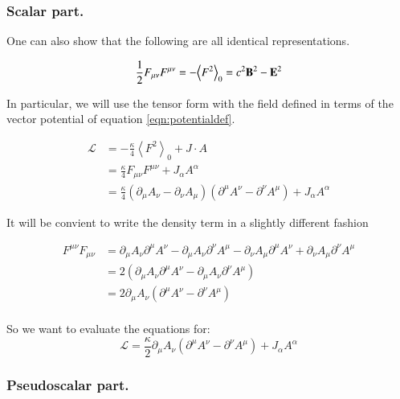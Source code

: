 \documentclass{article}
\newcommand{\LL}[0]{\mathcal{L}}
\newcommand{\gpgrade}[2] {{\left\langle{{#1}}\right\rangle}_{#2}}
\newcommand{\gpgradezero}[1] {\gpgrade{#1}{0}}
\begin{document}
\subsubsection{ Scalar part. }

One can also show that the following are all identical representations.

\begin{equation}
\inv{2} F_{\mu\nu}F^{\mu\nu} = -\gpgradezero{F^2} = c^2 \BB^2 -\BE^2
\end{equation}

In particular, we will use the tensor form with the field defined in terms of the vector potential of equation \ref{eqn:potentialdef}.

\begin{align}
\LL &= -\frac{\kappa}{4} \gpgradezero{F^2} + J \cdot A \\
&= \frac{\kappa}{4} F_{\mu\nu} F^{\mu\nu} + J_{\alpha} A^{\alpha} \\
&= \frac{\kappa}{4} ( \partial_{\mu} A_{\nu} - \partial_{\nu} A_{\mu} ) ( \partial^{\mu} A^{\nu} - \partial^{\nu} A^{\mu} ) + J_{\alpha} A^{\alpha}
\end{align}

It will be convient to write the density term in a slightly different fashion

\begin{align*}
F^{\mu\nu} F_{\mu\nu}
&=
\partial_{\mu} A_{\nu} \partial^{\mu} A^{\nu}
-\partial_{\mu} A_{\nu} \partial^{\nu} A^{\mu}
-\partial_{\nu} A_{\mu} \partial^{\mu} A^{\nu}
+\partial_{\nu} A_{\mu} \partial^{\nu} A^{\mu} \\
&= 2 \left( \partial_{\mu} A_{\nu} \partial^{\mu} A^{\nu} -\partial_{\mu} A_{\nu} \partial^{\nu} A^{\mu} \right) \\
&= 2 \partial_{\mu} A_{\nu} \left( \partial^{\mu} A^{\nu} -\partial^{\nu} A^{\mu} \right) \\
\end{align*}

So we want to evaluate the equations for:
\begin{equation}\label{eqn:density}
\LL = \frac{\kappa}{2} \partial_{\mu} A_{\nu} ( \partial^{\mu} A^{\nu} - \partial^{\nu} A^{\mu} ) + J_{\alpha} A^{\alpha}
\end{equation}

\subsubsection{ Pseudoscalar part. }
\end{document}
